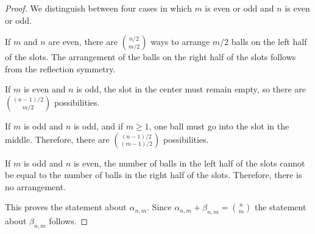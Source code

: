 \documentclass[11pt,a4paper]{article}
\begin{document}
\begin{proof}
We distinguish between four cases in which $m$ is even or odd and $n$ is even or odd.

If $m$ and $n$ are even, there are $\binom{n/2}{m/2}$ ways to
arrange $m/2$ balls on the left half of the slots.
The arrangement of the balls on the right half of the slots follows from the reflection symmetry.

If $m$ is even and $n$ is odd, the slot in the center must remain empty,
so there are $\binom{(n-1)/2}{m/2}$ possibilities.

If $m$ is odd and $n$ is odd, and if $m \ge 1$, one ball must go into the slot in the middle.
Therefore, there are $\binom{(n-1)/2}{(m-1)/2}$ possibilities.

If $m$ is odd and $n$ is even, the number of balls in the left half of the slots cannot be equal
to the number of balls in the right half of the slots.
Therefore, there is no arrangement.

This proves the statement about $\alpha_{n,m}$.
Since $\alpha_{n,m} + \beta_{n,m} = \binom{n}{m}$ the statement about $\beta_{n,m}$ follows.
\end{proof}
\end{document}
